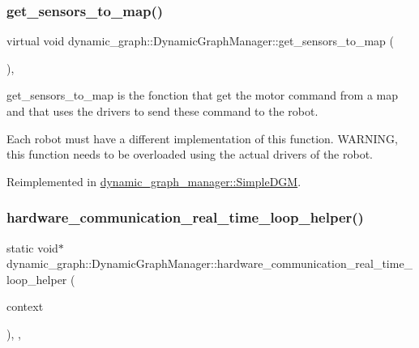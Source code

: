 \subsubsection{\texorpdfstring{get\+\_\+sensors\+\_\+to\+\_\+map()}{get\_sensors\_to\_map()}}
{\footnotesize\ttfamily virtual void dynamic\+\_\+graph\+::\+Dynamic\+Graph\+Manager\+::get\+\_\+sensors\+\_\+to\+\_\+map (\begin{DoxyParamCaption}\item[{\hyperlink{namespacedynamic__graph_a51212ed7fa4ae81e7b362a27f09b7ab8}{Vector\+D\+G\+Map} \&}]{ }\end{DoxyParamCaption})\hspace{0.3cm}{\ttfamily [inline]}, {\ttfamily [virtual]}}



get\+\_\+sensors\+\_\+to\+\_\+map is the fonction that get the motor command from a map and that uses the drivers to send these command to the robot. 

Each robot must have a different implementation of this function. W\+A\+R\+N\+I\+NG, this function needs to be overloaded using the actual drivers of the robot. 

Reimplemented in \hyperlink{classdynamic__graph__manager_1_1SimpleDGM_aa92cd33a31c934835252f834bab7b9f4}{dynamic\+\_\+graph\+\_\+manager\+::\+Simple\+D\+GM}.

\mbox{\label{classdynamic__graph_1_1DynamicGraphManager_a771ad93758759932899273c5f01975fc}} 
\subsubsection{\texorpdfstring{hardware\+\_\+communication\+\_\+real\+\_\+time\+\_\+loop\+\_\+helper()}{hardware\_communication\_real\_time\_loop\_helper()}}
{\footnotesize\ttfamily static void$\ast$ dynamic\+\_\+graph\+::\+Dynamic\+Graph\+Manager\+::hardware\+\_\+communication\+\_\+real\+\_\+time\+\_\+loop\+\_\+helper (\begin{DoxyParamCaption}\item[{void $\ast$}]{context }\end{DoxyParamCaption})\hspace{0.3cm}{\ttfamily [inline]}, {\ttfamily [static]}, {\ttfamily [private]}}



